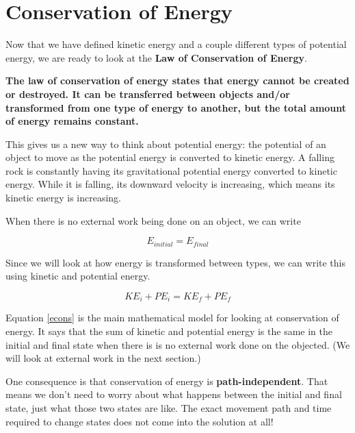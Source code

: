 \documentclass[12pt]{book}
\begin{document}
\section{Conservation of Energy} 

Now that we have defined kinetic energy and a couple different types of potential energy, we are ready to look at the \textbf{Law of Conservation of Energy}.

\linespace

\textbf{The law of conservation of energy states that energy cannot be created or destroyed. It can be transferred between objects and/or transformed from one type of energy to another, but the total amount of energy remains constant.}

\linespace

This gives us a new way to think about potential energy: the potential of an object to move as the potential energy is converted to kinetic energy. A falling rock is constantly having its gravitational potential energy converted to kinetic energy. While it is falling, its downward velocity is increasing, which means its kinetic energy is increasing.

When there is no external work being done on an object, we can write

\begin{equation}
E_{initial} = E_{final}
\end{equation}

Since we will look at how energy is transformed between types, we can write this using kinetic and potential energy.

\begin{equation}
KE_i + PE_i = KE_f + PE_f
\label{econs}
\end{equation}

Equation \ref{econs} is the main mathematical model for looking at conservation of energy. It says that the sum of kinetic and potential energy is the same in the initial and final state when there is is no external work done on the objected. (We will look at external work in the next section.)

One consequence is that conservation of energy is \textbf{path-independent}. That means we don't need to worry about what happens between the initial and final state, just what those two states are like. The exact movement path and time required to change states does not come into the solution at all!
\end{document}
